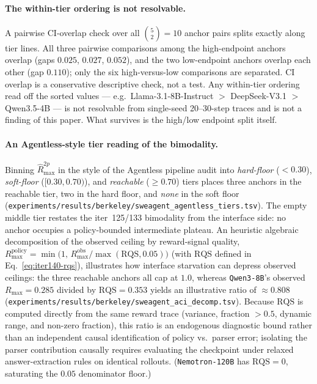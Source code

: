 \paragraph{The within-tier ordering is not resolvable.}
A pairwise CI-overlap check over all $\binom{5}{2} = 10$ anchor pairs
splits exactly along tier lines.  All three pairwise comparisons among
the high-endpoint anchors overlap (gaps $0.025$, $0.027$, $0.052$), and
the two low-endpoint anchors overlap each other (gap $0.110$); only the
six high-versus-low comparisons are separated.  CI overlap is a
conservative descriptive check, not a test.  Any within-tier ordering
read off the sorted values --- e.g.\ Llama-3.1-8B-Instruct $>$
DeepSeek-V3.1 $>$ Qwen3.5-4B --- is not resolvable from single-seed
20--30-step traces and is not a finding of this paper.  What survives
is the high/low endpoint split itself.

\paragraph{An Agentless-style tier reading of the bimodality.}
Binning $\hat R_{\max}^{2p}$ in the style of the Agentless
pipeline audit \citep{xia2024agentless} into \emph{hard-floor}
($< 0.30$), \emph{soft-floor} ($[0.30, 0.70)$), and \emph{reachable}
($\geq 0.70$) tiers places three anchors in the reachable tier, two in
the hard floor, and \emph{none} in the soft floor
(\texttt{experiments/results/berkeley/sweagent\_agentless\_tiers.tsv}).
The empty middle tier restates the iter~125/133 bimodality from the
interface side: no anchor occupies a policy-bounded intermediate
plateau.  An heuristic algebraic decomposition of the observed ceiling
by reward-signal quality, $R_{\max}^{\text{policy}} = \min\bigl(1,\,
R_{\max}^{\text{obs}} / \max(\mathrm{RQS}, 0.05)\bigr)$ (with
$\mathrm{RQS}$ defined in Eq.~\eqref{eq:iter140-rqs}), illustrates how
interface starvation can depress observed ceilings: the three reachable
anchors all cap at $1.0$, whereas \texttt{Qwen3-8B}'s observed
$R_{\max} = 0.285$ divided by $\mathrm{RQS} = 0.353$ yields an
illustrative ratio of $\approx 0.808$
(\texttt{experiments/results/berkeley/sweagent\_aci\_decomp.tsv}).
Because $\mathrm{RQS}$ is computed directly from the same reward trace
(variance, fraction $>0.5$, dynamic range, and non-zero fraction), this
ratio is an endogenous diagnostic bound rather than an independent
causal identification of policy vs.\ parser error; isolating the
parser contribution causally requires evaluating the checkpoint under
relaxed answer-extraction rules on identical rollouts.  (\texttt{Nemotron-120B}
has $\mathrm{RQS} = 0$, saturating the $0.05$ denominator floor.)


